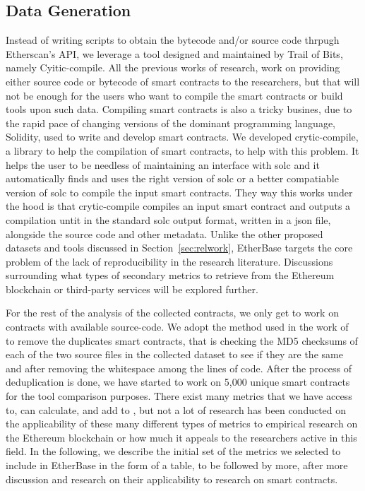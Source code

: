 	\subsection{Data Generation}
		Instead of writing scripts to obtain the bytecode and/or source code thrpugh Etherscan's API, we leverage a tool designed and maintained by Trail of Bits, namely Cyitic-compile.
		All the previous works of research, work on providing either source code or bytecode of smart contracts to the researchers, but that will not be enough for the users who want to compile the smart contracts or build tools upon such data.
		Compiling smart contracts is also a tricky busines, due to the rapid pace of changing versions of the dominant programming language, Solidity, used to write and develop smart contracts.
		We developed crytic-compile, a library to help the compilation of smart contracts, to help with this problem.
		It helps the user to be needless of maintaining an interface with solc and it automatically finds and uses the right version of solc or a better compatiable version of solc to compile the input smart contracts.
		They way this works under the hood is that crytic-compile compiles an input smart contract and outputs a compilation untit in the standard solc output format, written in a json file, alongside the source code and other metadata.
		Unlike the other proposed datasets and tools discussed in Section~\ref{sec:relwork}, EtherBase targets the core problem of the lack of reproducibility in the research literature.
		Discussions surrounding what types of secondary metrics to retrieve from the Ethereum blockchain or third-party services will be explored further.
		
		For the rest of the analysis of the collected contracts, we only get to work on contracts with available source-code.
		We adopt the method used in the work of ~\cite{deduplicate} to remove the duplicates smart contracts,
		that is checking the MD5 checksums of each of the two source files in the collected dataset to see if they are the same and after removing the whitespace among the lines of code.
		After the process of deduplication is done, we have started to work on 5,000 unique smart contracts for the tool comparison purposes.
		There exist many metrics that we have access to, can calculate, and add to \etherbase, but not a lot of research has been conducted on the applicability
		of these many different types of metrics to empirical research on the Ethereum blockchain or how much it appeals to the researchers active in this field.
		In the following, we describe the initial set of the metrics we selected to include in EtherBase in the form of a table, to be followed by more,
		after more discussion and research on their applicability to research on smart contracts.

